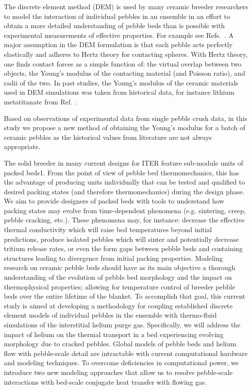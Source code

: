 The discrete element method (DEM) is used by many ceramic breeder researchers to model the interaction of individual pebbles in an ensemble in an effort to obtain a more detailed understanding of pebble beds than is possible with experimental measurements of effective properties. For example see Refs.~\cite{An20071393, Lu2000, Zhao2010, Gan2010a, Annabattula2012a, VanLew2014}. A major assumption in the DEM formulation is that each pebble acts perfectly elastically and adheres to Hertz theory for contacting spheres. With Hertz theory, one finds contact forces as a simple function of: the virtual overlap between two objects, the Young's modulus of the contacting material (and Poisson ratio), and radii of the two. In past studies, the Young's modulus of the ceramic materials  used in DEM simulations was taken from historical data, for instance lithium metatitanate from Ref.~\cite{Gierszewski1998}.

Based on observations of experimental data from single pebble crush data, in this study we propose a new method of obtaining the Young's modulus for a batch of ceramic pebbles as the historical values from literature are not always appropriate.


The solid breeder in many current designs for ITER feature sub-module units of packed beds1. From the point of view of pebble bed thermomechanics, this has the advantage of producing units individually that can be tested and qualified to desired packing states (and therefore thermomechanics) during the design phase.
We aim to provide designers of packed beds with tools to understand how packing states may evolve from time-dependent phenomena (e.g. sintering, creep, pebble cracking, etc.). These phenomena may, for instance: decrease the effective thermal conductivity which will raise bed temperatures beyond initial predictions, produce isolated pebbles which will sinter and potentially decrease tritium release rates, or even the form gaps between pebble beds and containing structures leading to divergence from initial packing properties. 
Modeling research on ceramic pebble beds should have as its main objective a thorough understanding of the evolution of pebble bed morphology and the impact on thermophysical properties; allowing for temperature control of breeder pebble beds over the entire lifetime of the blanket. To accomplish that goal, this current study is aimed at developing a methodology for coupling established discrete element models of individual pebbles in the ensemble with thermo-fluid simulations of the interstitial helium purge gas. Specifically, we will address the impact of helium on the thermal transport in a bed experiencing evolving morphology due to cracked pebbles.
Global models of pebble beds and helium flow with pebble-scale detail are intractable with current computational hardware and modeling techniques. To overcome deficiencies in computational power, we introduce two new modeling approaches that allow us to resolve pebble-scale interactions with bed-scale conjugate heat transfer with flowing gas.
